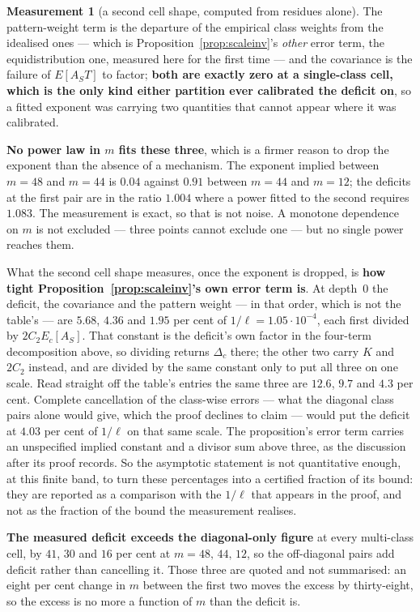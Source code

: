 \documentclass[11pt,a4paper]{article}
\theoremstyle{plain}
\theoremstyle{definition}
\newtheorem{measurement}[theorem]{Measurement}
\theoremstyle{remark}
\begin{document}
\begin{measurement}[a second cell shape, computed from residues alone]
The pattern-weight term is the departure of the empirical class weights
from the idealised ones --- which is
Proposition~\ref{prop:scaleinv}'s \emph{other} error term, the
equidistribution one, measured here for the first time --- and the
covariance is the failure of $E[A_ST]$ to factor; \textbf{both are
exactly zero at a single-class cell, which is the only kind either
partition ever calibrated the deficit on}, so a fitted exponent was
carrying two quantities that cannot appear where it was calibrated.

\textbf{No power law in $m$ fits these three}, which is a firmer
reason to drop the exponent than the absence of a mechanism. The
exponent implied between $m=48$ and $m=44$ is $0.04$ against $0.91$
between $m=44$ and $m=12$; the deficits at the first pair are in the
ratio $1.004$ where a power fitted to the second requires $1.083$. The
measurement is exact, so that is not noise. A monotone dependence on
$m$ is not excluded --- three points cannot exclude one --- but no
single power reaches them.

What the second cell shape measures, once the exponent is dropped, is
\textbf{how tight Proposition~\ref{prop:scaleinv}'s own error term is}.
At depth~$0$ the deficit, the covariance and the pattern weight --- in
that order, which is not the table's --- are $5.68$, $4.36$ and $1.95$
per cent of $1/\ell=1.05\cdot10^{-4}$, each first divided by
$2C_2E_c[A_S]$. That constant is the deficit's own factor in the four-term
decomposition above, so dividing returns $\Delta_c$ there; the other two
carry $K$ and $2C_2$ instead, and are divided by the same constant only
to put all three on one scale. Read straight off the table's entries
the same three are $12.6$, $9.7$ and $4.3$ per cent. Complete
cancellation of the class-wise errors --- what the diagonal class pairs
alone would give, which the proof declines to claim --- would put the
deficit at $4.03$ per cent of $1/\ell$ on that same scale.
The proposition's error term carries an unspecified implied constant
and a divisor sum above three, as the discussion after its proof
records. So the asymptotic statement is not quantitative enough, at
this finite band, to turn these percentages into a certified fraction
of its bound: they are reported as a comparison with the $1/\ell$ that
appears in the proof, and not as the fraction of the bound the
measurement realises.

\textbf{The measured deficit exceeds the diagonal-only figure} at every
multi-class cell, by $41$, $30$ and $16$ per cent at $m=48,\,44,\,12$,
so the off-diagonal pairs add deficit rather than cancelling it. Those
three are quoted and not summarised: an eight per cent change in $m$
between the first two moves the excess by thirty-eight, so the excess
is no more a function of $m$ than the deficit is.


\end{measurement}
\end{document}
